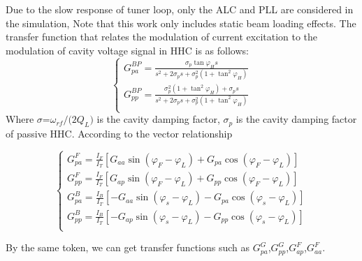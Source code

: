 \documentclass[letterpaper,
               nospread,     %
               ]{jacow}
\begin{document}
Due to the slow response of tuner loop, only the ALC and PLL are
considered in the simulation\cite{ref8}, Note that this work
only includes static beam loading effects.
The transfer function that relates the modulation of current
excitation to the
modulation of cavity voltage signal in HHC is as follows:
\begin{equation}\label{eq:label}
   \left\{ \begin{matrix}
      G_{pa}^{BP}=\frac{\sigma _{p}^{{}}\tan {{\varphi }_{H}}s}{{{s}^{2}}+2\sigma _{p}^{{}}s+\sigma _{p}^{2}(1+{{\tan }^{2}}{{\varphi }_{H}})}                             \\
      G_{pp}^{BP}=\frac{\sigma _{p}^{2}(1+{{\tan }^{2}}{{\varphi }_{H}})+\sigma _{p}^{{}}s}{{{s}^{2}}+2\sigma _{p}^{{}}s+\sigma _{p}^{2}(1+{{\tan }^{2}}{{\varphi }_{H}})} \\
   \end{matrix} \right.
\end{equation}
\hspace*{1em}Where ${\sigma \text{=}{{{\omega }_{rf}}}/{\text{(}2{{Q}_{L}}\text{)}}}$ is the cavity damping factor,
${{\sigma }_{p}}$ is the cavity damping factor of passive HHC. According to the vector relationship
\begin{small}
   \begin{equation}\label{eq:label}
      \left\{ \begin{matrix}
         G_{pa}^{F}=\frac{{{I}_{F}}}{{{I}_{T}}}\left[ {{G}_{aa}}\sin \left( {{\varphi }_{F}}-{{\varphi }_{L}} \right)+{{G}_{pa}}\cos \left( {{\varphi }_{F}}-{{\varphi }_{L}} \right) \right]  \\
         G_{pp}^{F}=\frac{{{I}_{F}}}{{{I}_{T}}}\left[ {{G}_{ap}}\sin \left( {{\varphi }_{F}}-{{\varphi }_{L}} \right)+{{G}_{pp}}\cos \left( {{\varphi }_{F}}-{{\varphi }_{L}} \right) \right]  \\
         G_{pa}^{B}=\frac{{{I}_{B}}}{{{I}_{T}}}\left[ -{{G}_{aa}}\sin \left( {{\varphi }_{s}}-{{\varphi }_{L}} \right)-{{G}_{pa}}\cos \left( {{\varphi }_{s}}-{{\varphi }_{L}} \right) \right] \\
         G_{pp}^{B}=\frac{{{I}_{B}}}{{{I}_{T}}}\left[ -{{G}_{ap}}\sin \left( {{\varphi }_{s}}-{{\varphi }_{L}} \right)-{{G}_{pp}}\cos \left( {{\varphi }_{s}}-{{\varphi }_{L}} \right) \right] \\
      \end{matrix} \right.
   \end{equation}
\end{small}
\hspace*{1em}By the same token, we can get transfer functions such as ${G_{pa}^{G}}$,${G_{pp}^{G}}$,${G_{ap}^{F}}$,${G_{aa}^{F}}$.
\end{document}
